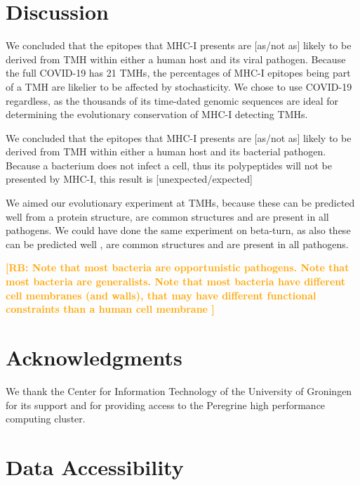 \documentclass{article}
\newcommand{\richel}[1]{\textcolor{orange}{\textbf{[RB: #1]}}}
\begin{document}
\section{Discussion}

We concluded that the
epitopes that MHC-I presents are [as/not as] likely 
to be derived from TMH within either a human host and its viral pathogen.
Because the full COVID-19 has 21 TMHs, the percentages
of MHC-I epitopes being part of a TMH are likelier to be affected by
stochasticity. We chose to use COVID-19 regardless, as the thousands
of its time-dated genomic sequences are ideal for determining the 
evolutionary conservation of MHC-I detecting TMHs. 

We concluded that the
epitopes that MHC-I presents are [as/not as] likely 
to be derived from TMH within either a human host and its bacterial pathogen.
Because a bacterium does not infect a cell, thus its polypeptides
will not be presented by MHC-I, this result is [unexpected/expected]

We aimed our evolutionary experiment at TMHs, because these can
be predicted well from a protein structure,
are common structures and are present in all pathogens. 
We could have done the same experiment on beta-turn,
as also these can be predicted well \cite{petersen2010netturnp},
are common structures and are present in all pathogens.

\richel{
  Note that most bacteria are opportunistic pathogens.
  Note that most bacteria are generalists.
  Note that most bacteria have different cell membranes (and walls), that
  may have different functional constraints than a human cell membrane
}

\section{Acknowledgments}

We thank the Center for Information Technology of the University 
of Groningen for its support and for providing access to the Peregrine 
high performance computing cluster. 

\section{Data Accessibility}
\end{document}
